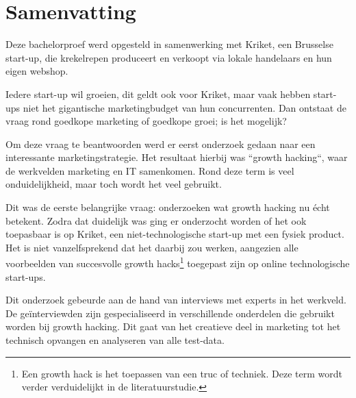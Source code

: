 
%
%


\chapter*{Samenvatting}

Deze bachelorproef werd opgesteld in samenwerking met Kriket, een Brusselse start-up, die krekelrepen produceert en verkoopt via lokale handelaars en hun eigen webshop. 

Iedere start-up wil groeien, dit geldt ook voor Kriket, maar vaak hebben start-ups niet het gigantische marketingbudget van hun concurrenten. Dan ontstaat de vraag rond goedkope marketing of goedkope groei; is het mogelijk?

Om deze vraag te beantwoorden werd er eerst onderzoek gedaan naar een interessante marketingstrategie. Het resultaat hierbij was ``growth hacking``, waar de werkvelden marketing en IT samenkomen. Rond deze term is veel onduidelijkheid, maar toch wordt het veel gebruikt.

Dit was de eerste belangrijke vraag: onderzoeken wat growth hacking nu écht betekent. Zodra dat duidelijk was ging er onderzocht worden of het ook toepasbaar is op Kriket, een niet-technologische start-up met een fysiek product. Het is niet vanzelfsprekend dat het daarbij zou werken, aangezien alle voorbeelden van succesvolle growth hacks\footnote{Een growth hack is het toepassen van een truc of techniek. Deze term wordt verder verduidelijkt in de literatuurstudie.} toegepast zijn op online technologische start-ups.

Dit onderzoek gebeurde aan de hand van interviews met experts in het werkveld. De geïnterviewden zijn gespecialiseerd in verschillende onderdelen die gebruikt worden bij growth hacking. Dit gaat van het creatieve deel in marketing tot het technisch opvangen en analyseren van alle test-data. 

